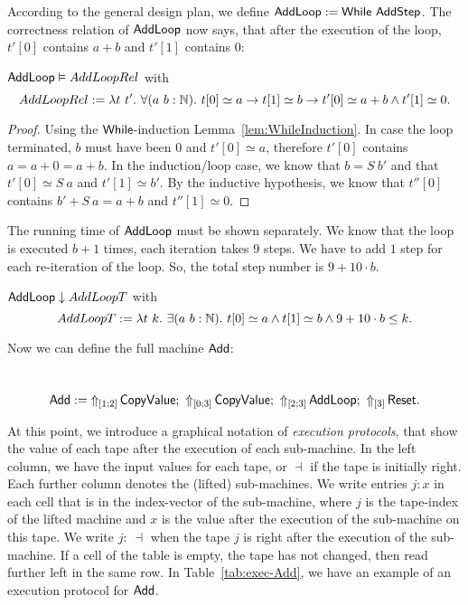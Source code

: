 According to the general design plan, we define $\MS{AddLoop} := \While~\MS{AddStep}$.  The correctness relation of $\MS{AddLoop}$ now says, that
after the execution of the loop, $t'[0]$ contains $a+b$ and $t'[1]$ contains $0$:
\begin{lemma}
  \label{lem:Add_Loop_Realise}
  $\MS{AddLoop} \Realise AddLoopRel$ with
  \[
    AddLoopRel := \lambda t~t'.~\forall (a~b:\Nat).~t[0] \simeq a \rightarrow t[1] \simeq b \rightarrow t'[0] \simeq a+b \land t'[1] \simeq 0.
  \]
\end{lemma}
\begin{proof}
  Using the $\While$-induction Lemma~\ref{lem:WhileInduction}.  In case the loop terminated, $b$ must have been $0$ and $t'[0] \simeq a$, therefore
  $t'[0]$ contains $a=a+0=a+b$.  In the induction/loop case, we know that $b=S~b'$ and that $t'[0] \simeq S~a$ and $t'[1] \simeq b'$.  By the
  inductive hypothesis, we know that $t''[0]$ contains $b' + S~a = a+b$ and $t''[1] \simeq 0$.
\end{proof}

The running time of $\MS{AddLoop}$ must be shown separately.  We know that the loop is executed $b+1$ times, each iteration takes $9$ steps.  We have to
add $1$ step for each re-iteration of the loop.  So, the total step number is $9+10 \cdot b$.
\begin{lemma}
  \label{lem:Add_Loop_TerminatesIn}
  $\MS{AddLoop} \downarrow AddLoopT$ with
  \[
    AddLoopT := \lambda t~k.~\exists (a~b:\Nat).~t[0] \simeq a \land t[1] \simeq b \land 9+10 \cdot b \leq k.
  \]
\end{lemma}

Now we can define the full machine $\MS{Add}$:
\begin{definition}[$\MS{Add}$][Add]
  \label{def:Add}
  ~
  \[
    \MS{Add} :=
    \LiftTapes{\MS{CopyValue}}{\Vector{1;2}} \Seq
    \LiftTapes{\MS{CopyValue}}{\Vector{0;3}} \Seq
    \LiftTapes{\MS{AddLoop}}{\Vector{2;3}} \Seq
    \LiftTapes{\MS{Reset}}{\Vector{3}}.
  \]
\end{definition}

At this point, we introduce a graphical notation of \emph{execution protocols}, that show the value of each tape after the execution of each
sub-machine.  In the left column, we have the input values for each tape, or $\dashv$ if the tape is initially right.  Each further column denotes the
(lifted) sub-machines.  We write entries $j: x$ in each cell that is in the index-vector of the sub-machine, where $j$ is the tape-index of the lifted
machine and $x$ is the value after the execution of the sub-machine on this tape.  We write $j:~\dashv$ when the tape $j$ is right after the execution
of the sub-machine.  If a cell of the table is empty, the tape has not changed, then read further left in the same row.  In Table~\ref{tab:exec-Add},
we have an example of an execution protocol for $\MS{Add}$.


